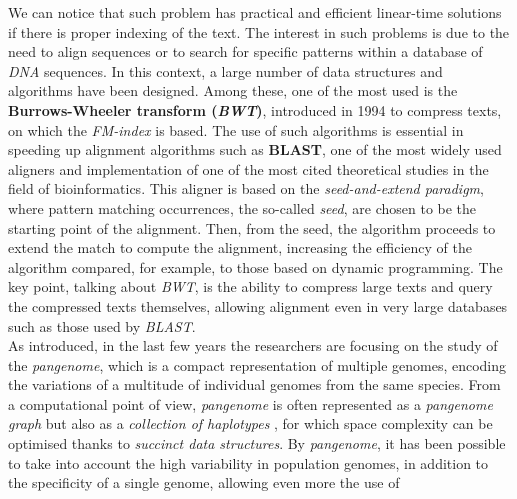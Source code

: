 \documentclass[a4paper,11pt, oneside]{article}
\newcommand{\gdv}[1]{\todo[backgroundcolor=green]{\textbf{GDV} #1}}
\newcommand{\dc}[1]{\todo[backgroundcolor=yellow]{\textbf{DC} #1}}
\begin{document}
We can notice that such problem
has practical and efficient linear-time solutions if there is proper indexing
of the text. The interest in such 
problems is due to the need to align sequences or to search for specific
patterns within a database of \textit{DNA} sequences. 
In this context, a large number of data structures and algorithms have been
designed. Among these, one of the most used is the \textbf{Burrows-Wheeler
  transform (\textit{BWT})}, introduced in 1994 to compress texts, on which the
\textit{FM-index} is based.  
The use of such 
algorithms is essential in speeding up alignment algorithms such as
\textbf{BLAST}, one of the most widely used aligners and implementation of one
of the most cited theoretical studies in the field of bioinformatics.
This aligner is based on the \textit{seed-and-extend paradigm}, where pattern
matching occurrences, the so-called \textit{seed}, are chosen to be the starting
point of 
the alignment. Then, from the seed, the algorithm proceeds to extend the match
to compute the alignment, increasing the efficiency of the
algorithm compared, for example, to those based on dynamic programming.
The key point, talking about \textit{BWT}, is the ability to compress large
texts and query the compressed texts themselves, allowing alignment even 
in very large databases such as those used by \textit{BLAST}.\\
As introduced, in the last few years the researchers are focusing on the study
of the \textit{pangenome}, which is a compact 
representation of multiple genomes, encoding the variations of a multitude of
individual genomes from the same species. From a computational point of view,
\textit{pangenome} is often represented as a \textit{pangenome graph} but also
as a \textit{collection of haplotypes} \cite{pancon}, for which space complexity
can be optimised thanks to \textit{succinct data structures}. By
\textit{pangenome}, it has been possible to take into account the high
variability in population genomes, in 
addition to the specificity of a single genome, allowing even more the use of
\end{document}
